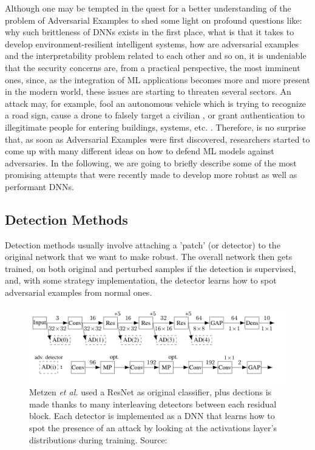 \documentclass[LaM,binding=0.6cm]{./packages/sapthesis/sapthesis}
\begin{document}
    Although one may be tempted in the quest for a better understanding of the problem of 
    Adversarial Examples to shed some light on profound questions like: 
    why such brittleness of DNNs exists in the first place, what is that it takes to develop environment-resilient intelligent systems, how are adversarial examples and the interpretability problem related to each other \cite{robustness_accuracy}
    and so on, it is undeniable that the security concerns are, from a practical perspective, the most imminent 
    ones, since, as the integration of ML applications becomes more and more present in 
    the modern world, these issues are starting to threaten several sectors. 
    An attack may, for example, fool an autonomous vehicle which is trying to recognize a road sign, 
    cause a drone to falsely target a civilian \cite{aerialveichles}, or grant authentication to illegitimate people for
    entering buildings, systems, etc. . Therefore, is no surprise that, as soon as
    Adversarial Examples were first discovered, researchers started to come up with many different
    ideas on how to defend ML models against adversaries. In the following, we
    are going to briefly describe some of the most promising attempts that were recently made to develop 
    more robust as well as performant DNNs. 

    \subsection{Detection Methods}

            Detection methods usually involve attaching a 'patch' (or detector) to the original network that we
            want to make robust. The overall network then gets trained, on both original and perturbed samples if the detection
            is supervised, and, with some strategy implementation, the detector learns how to spot adversarial examples 
            from normal ones. 

            \begin{figure}[b]
                \centering
                \includegraphics[scale=0.30]{detection}
                \caption{Metzen \textit{et al.} \cite{adv_detect} used a ResNet as original classifier, plus dections is made thanks to many interleaving detectors
                between each residual block. Each detector is implemented as a DNN that learns how to spot the presence
                of an attack by looking at the activations layer's distributions during training. Source: \cite{adv_detect}}
                \label{fig:detection}
            \end{figure}
\end{document}
